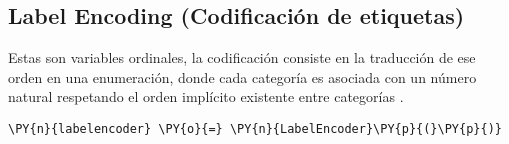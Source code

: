 \begin{table}[H]
\centering
\setlength{\tabcolsep}{5pt}
\caption{Binary Encoding con las variables que actualmente poseen dos estados activos}
\label{tab:Binary encoding}
\end{table}
        
    \hypertarget{label-encoding-codificaciuxf3n-de-etiquetas}{%
\subsection{Label Encoding (Codificación de
etiquetas)}\label{label-encoding-codificaciuxf3n-de-etiquetas}}

Estas son variables ordinales, la codificación consiste en la traducción
de ese orden en una enumeración, donde cada categoría es asociada con un
número natural respetando el orden implícito existente entre categorías \cite{Hancock2020}.

    \begin{tcolorbox}[breakable, size=fbox, boxrule=1pt, pad at break*=1mm,colback=cellbackground, colframe=cellborder]
\begin{Verbatim}[commandchars=\\\{\}]
\PY{n}{labelencoder} \PY{o}{=} \PY{n}{LabelEncoder}\PY{p}{(}\PY{p}{)}
\end{Verbatim}
\end{tcolorbox}

